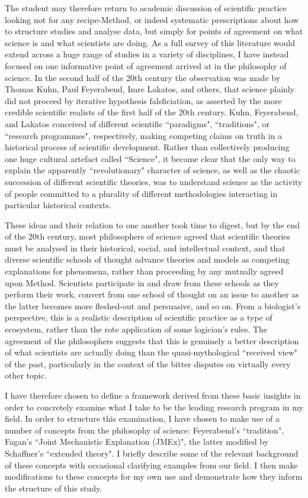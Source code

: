 The student may therefore return to academic discussion of scientific practice looking not for any recipe-Method, or indeed systematic prescriptions about how to structure studies and analyse data, but simply for points of agreement on what science is and what scientists are doing. As a full survey of this literature would extend across a huge range of studies in a variety of disciplines, I have instead focused on one informative point of agreement arrived at in the philosophy of science. In the second half of the 20th century the observation was made by Thomas Kuhn, Paul Feyerabend, Imre Lakatos, and others, that science plainly did not proceed by iterative hypothesis falsficiation, as asserted by the more credible scientific realists of the first half of the 20th century. Kuhn, Feyerabend, and Lakatos conceived of different scientific ``paradigms", ``traditions", or ``research programmes", respectively, making competing claims on truth in a historical process of scientific development. Rather than collectively producing one huge cultural artefact called ``Science", it became clear that the only way to explain the apparently ``revolutionary" character of science, as well as the chaotic succession of different scientific theories, was to understand science as the activity of people committed to a plurality of different methodologies interacting in particular historical contexts.

These ideas and their relation to one another took time to digest, but by the end of the 20th century, most philosophers of science agreed that scientific theories must be analysed in their historical, social, and intellectual context, and that diverse scientific schools of thought advance theories and models as competing explanations for phenomena, rather than proceeding by any mutually agreed upon Method. Scientists participate in and draw from these schools as they perform their work, convert from one school of thought on an issue to another as the latter becomes more fleshed-out and persuasive, and so on. From a biologist's perspective, this is a realistic description of scientific practice as a type of ecosystem, rather than the rote application of some logician's rules. The agreement of the philosophers suggests that this is genuinely a better description of what scientists are actually doing than the quasi-mythological ``received view" of the past, particularly in the context of the bitter disputes on virtually every other topic.

I have therefore chosen to define a framework derived from these basic insights in order to concretely examine what I take to be the leading research program in my field. In order to structure this examination, I have chosen to make use of a number of concepts from the philosophy of science: Feyerabend's ``tradition", Fagan's ``Joint Mechanistic Explanation (JMEx)", the latter modified by Schaffner's ``extended theory". I briefly describe some of the relevant background of these concepts with occasional clarifying examples from our field. I then make modifications to these concepts for my own use and demonstrate how they inform the structure of this study.

